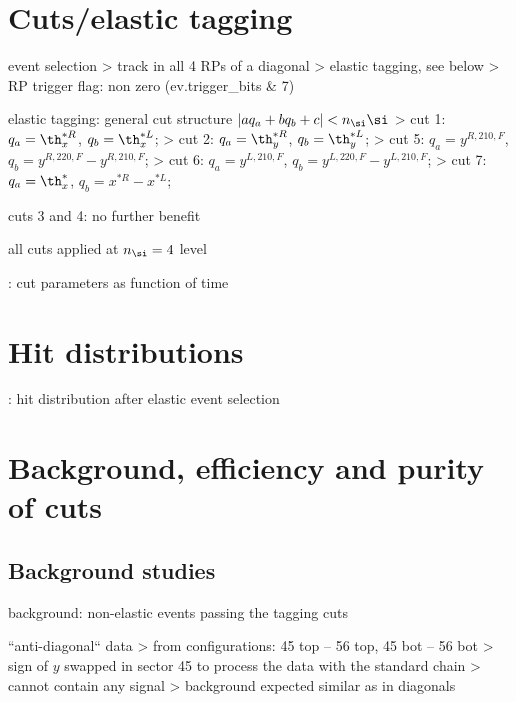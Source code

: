 \section{Cuts/elastic tagging}

\> event selection
\>> track in all 4 RPs of a diagonal
\>> elastic tagging, see below
\>> RP trigger flag: non zero (ev.trigger\_bits \& 7)

\> elastic tagging: general cut structure $| a q_a + b q_b + c| < n_\si  \si$
\>> cut 1: $q_a = \th_x^{*R}$, $q_b = \th_x^{*L}$; 
\>> cut 2: $q_a = \th_y^{*R}$, $q_b = \th_y^{*L}$; 
\>> cut 5: $q_a = y^{R,210,F}$, $q_b = y^{R,220,F} - y^{R,210,F}$; 
\>> cut 6: $q_a = y^{L,210,F}$, $q_b = y^{L,220,F} - y^{L,210,F}$; 
\>> cut 7: $q_a = \th_x^*$, $q_b = x^{*R} - x^{*L}$; 

\> cuts 3 and 4: no further benefit

\> all cuts applied at $n_\si = 4$ level

\>  : cut parameters as function of time



\section{Hit distributions}

\> : hit distribution after elastic event selection



\section{Background, efficiency and purity of cuts}

\subsection{Background studies}

\> background: non-elastic events passing the tagging cuts

\> ``anti-diagonal`` data
\>> from configurations: 45 top -- 56 top, 45 bot -- 56 bot
\>> sign of $y$ swapped in sector 45 to process the data with the standard chain
\>> cannot contain any signal
\>> background expected similar as in diagonals

